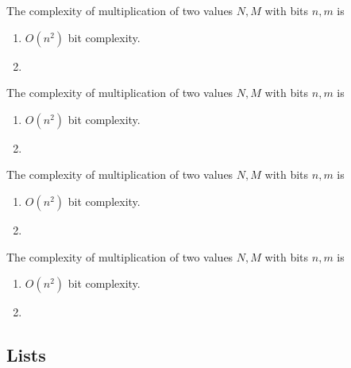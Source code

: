 \documentclass{article}
\begin{document}
    \begin{theorem}
      The complexity of multiplication of two values $N, M$ with bits $n, m$ is 
      \begin{enumerate}
        \item $O(n^2)$ bit complexity. 
        \item 
      \end{enumerate}
    \end{theorem}

    \begin{theorem}
      The complexity of multiplication of two values $N, M$ with bits $n, m$ is 
      \begin{enumerate}
        \item $O(n^2)$ bit complexity. 
        \item 
      \end{enumerate}
    \end{theorem}

    \begin{theorem}
      The complexity of multiplication of two values $N, M$ with bits $n, m$ is 
      \begin{enumerate}
        \item $O(n^2)$ bit complexity. 
        \item 
      \end{enumerate}
    \end{theorem}

    \begin{theorem}
      The complexity of multiplication of two values $N, M$ with bits $n, m$ is 
      \begin{enumerate}
        \item $O(n^2)$ bit complexity. 
        \item 
      \end{enumerate}
    \end{theorem}

    \begin{definition}[Factorial]
      
    \end{definition}
  
  \subsection{Lists} 

    \begin{definition}
      
    \end{definition}
\end{document}
